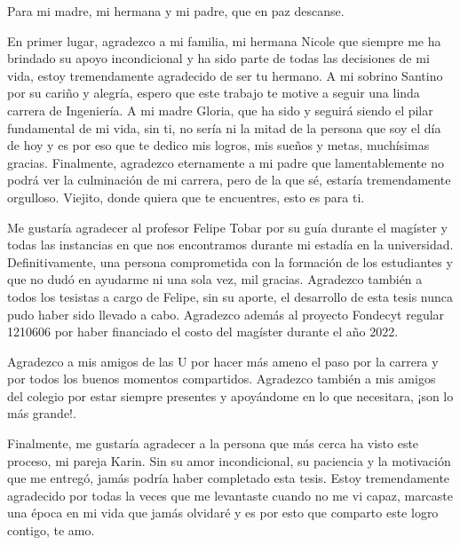 \documentclass[
	spanish, %
	letterpaper, oneside
]{book}
\begin{document}
\begin{dedicatory}
	Para mi madre, mi hermana y mi padre, que en paz descanse. \\
\end{dedicatory}

\begin{acknowledgments}

En primer lugar, agradezco a mi familia, mi hermana Nicole que siempre me ha brindado su apoyo incondicional y ha sido parte de todas las decisiones de mi vida, estoy tremendamente agradecido de ser tu hermano. A mi sobrino Santino por su cariño y alegría, espero que este trabajo te motive a seguir una linda carrera de Ingeniería. A mi madre Gloria, que ha sido y seguirá siendo el pilar fundamental de mi vida, sin ti, no sería ni la mitad de la persona que soy el día de hoy y es por eso que te dedico mis logros, mis sueños y metas, muchísimas gracias. Finalmente, agradezco eternamente a mi padre que lamentablemente no podrá ver la culminación de mi carrera, pero de la que sé, estaría tremendamente orgulloso. Viejito, donde quiera que te encuentres, esto es para ti. 

\vspace{0.2cm}

Me gustaría agradecer al profesor Felipe Tobar por su guía durante el magíster y todas las instancias en que nos encontramos durante mi estadía en la universidad. Definitivamente, una persona comprometida con la formación de los estudiantes y que no dudó en ayudarme ni una sola vez, mil gracias. Agradezco también a todos los tesistas a cargo de Felipe, sin su aporte, el desarrollo de esta tesis nunca pudo haber sido llevado a cabo. Agradezco además al proyecto Fondecyt regular 1210606 por haber financiado el costo del magíster durante el año 2022.

\vspace{0.2cm}

Agradezco a mis amigos de las U por hacer más ameno el paso por la carrera y por todos los buenos momentos compartidos. Agradezco también a mis amigos del colegio por estar siempre presentes y apoyándome en lo que necesitara, ¡son lo más grande!. 

\vspace{0.2cm}

Finalmente, me gustaría agradecer a la persona que más cerca ha visto este proceso, mi pareja Karin. Sin su amor incondicional, su paciencia y la motivación que me entregó, jamás podría haber completado esta tesis. Estoy tremendamente agradecido por todas la veces que me levantaste cuando no me vi capaz, marcaste una época en mi vida que jamás olvidaré y es por esto que comparto este logro contigo, te amo. 


\end{acknowledgments}
\end{document}
